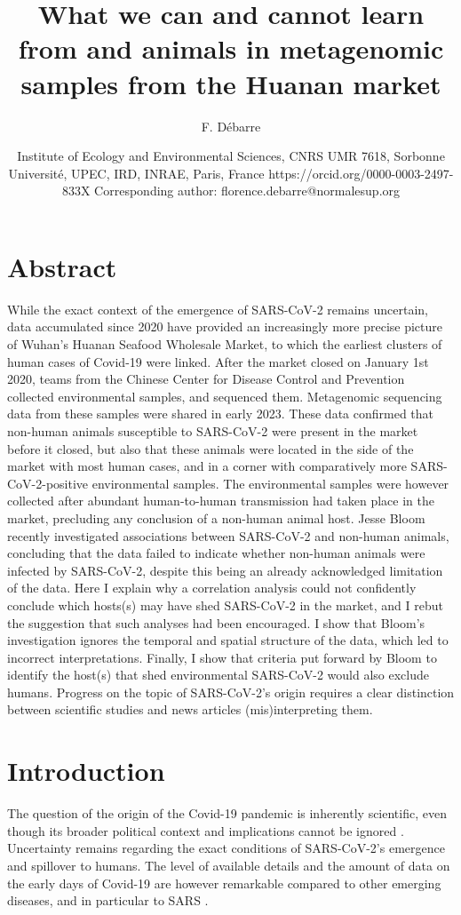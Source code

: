 \documentclass[11pt]{article}
\title{What we can and cannot learn from \sct{} and animals in metagenomic samples from the Huanan market}
\author{F. D\'ebarre}
\date{Institute of Ecology and Environmental Sciences, CNRS UMR 7618, Sorbonne Université, UPEC, IRD, INRAE, Paris, France \newline https://orcid.org/0000-0003-2497-833X \newline Corresponding author: florence.debarre@normalesup.org}
\def \sct {\mbox{SARS-CoV-2}}
\begin{document}
\maketitle

\linenumbers


\section*{Abstract}
While the exact context of the emergence of \sct{} remains uncertain, data accumulated since 2020 have provided an increasingly more precise picture of Wuhan’s Huanan Seafood Wholesale Market, to which the earliest clusters of human cases of Covid-19 were linked. After the market closed on January 1st 2020, teams from the Chinese Center for Disease Control and Prevention collected environmental samples, and sequenced them. Metagenomic sequencing data from these samples were shared in early 2023. These data confirmed that non-human animals susceptible to \sct{} were present in the market before it closed, but also that these animals were located in the side of the market with most human cases, and in a corner with comparatively more \sct{}-positive environmental samples. The environmental samples were however collected after abundant human-to-human transmission had taken place in the market, precluding any conclusion of a non-human animal host. Jesse Bloom recently investigated associations between \sct{} and non-human animals, concluding that the data failed to indicate whether non-human animals were infected by \sct{}, despite this being an already acknowledged limitation of the data. Here I explain why a correlation analysis could not confidently conclude which hosts(s) may have shed \sct{} in the market, and I rebut the suggestion that such analyses had been encouraged. I show that Bloom’s investigation ignores the temporal and spatial structure of the data, which led to incorrect interpretations. Finally, I show that criteria put forward by Bloom to identify the host(s) that shed environmental \sct{} would also exclude humans. Progress on the topic of \sct{}'s origin requires a clear distinction between scientific studies and news articles (mis)interpreting them. 

\section{Introduction}

The question of the origin of the Covid-19 pandemic is inherently scientific, even though its broader political context and implications cannot be ignored \citep{GostinGronvall2023NEJM}. Uncertainty remains regarding the exact conditions of \sct{}'s emergence and spillover to humans. The level of available details and the amount of data on the early days of Covid-19 are however remarkable compared to other emerging diseases, and in particular to SARS \citep{Xu2004EID, Keusch2022PNAS}.
\end{document}
